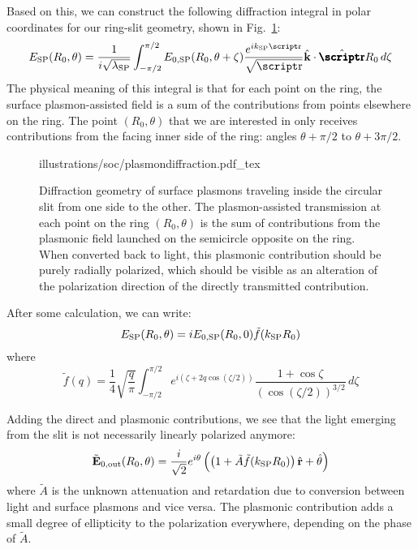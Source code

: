 Based on this, we can construct the following diffraction integral in polar coordinates for our ring-slit geometry, shown in Fig.~\ref{soc:fig:innercircle}:
\begin{equation}
  E_\SP(R_0, \theta) =
  \frac{1}{i\sqrt{\lambda_\SP}} \int_{-\pi/2}^{\pi/2}
  E_{0,\SP}(R_0, \theta+\zeta)
  \frac{e^{ik_\SP\rsep}}{\sqrt{\rsep}} \uvect{k} \cdot \ursep R_0 \,d\zeta
\end{equation}
The physical meaning of this integral is that for each point on the ring, the surface plasmon-assisted field is a sum of the contributions from points elsewhere on the ring.
The point $(R_0,\theta)$ that we are interested in only receives contributions from the facing inner side of the ring: angles $\theta+\pi/2$ to $\theta+3\pi/2$.
%
\begin{figure}[tb]
\forcerectofloat\centering
{illustrations/soc/plasmondiffraction.pdf_tex}
\caption{Diffraction geometry of surface plasmons traveling inside the circular slit from one side to the other. The plasmon-assisted transmission at each point on the ring $(R_0,\theta)$ is the sum of contributions from the plasmonic field launched on the semicircle opposite on the ring. When converted back to light, this plasmonic contribution should be purely radially polarized, which should be visible as an alteration of the polarization direction of the directly transmitted contribution.}
\label{soc:fig:innercircle}
\end{figure}

After some calculation, we can write:
\begin{equation}
E_{\mathrm{SP}}(R_0,\theta) = i E_{0,\mathrm{SP}}(R_0, 0) \tilde{f}(k_{\mathrm{SP}} R_0)
\end{equation}
where
\[ \tilde{f}(q) = \frac{1}{4} \sqrt{\frac{q}{\pi}} \int_{-\pi/2}^{\pi/2}
   e^{i(\zeta + 2q\cos(\zeta/2))} \frac{1+\cos\zeta}{(\cos(\zeta/2))^{3/2}} \,d\zeta \]

Adding the direct and plasmonic contributions, we see that the light emerging from the slit is not necessarily linearly polarized anymore:
\begin{equation}
  \tilde{\mathbf{E}}_{0,\mathrm{out}}(R_0, \theta) = \frac{i}{\sqrt{2}} e^{i\theta} \left(
  \left(1 + \tilde{A}\tilde{f}(k_{\mathrm{SP}} R_0)\right)\hat{\mathbf{r}} + \hat{\mathbf{\theta}} \right)
\end{equation}
where $\tilde{A}$ is the unknown attenuation and retardation due to conversion between light and surface plasmons and vice versa. The plasmonic contribution adds a small degree of ellipticity to the polarization everywhere, depending on the phase of $\tilde{A}$.
